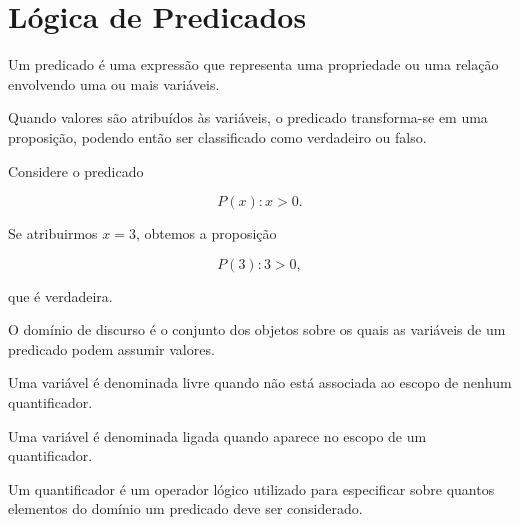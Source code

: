 \documentclass[../../main]{subfiles}
\begin{document}
\section{Lógica de Predicados}
\label{sec:matematica:logica-matematica:logica-de-predicados}

\begin{defn}[Predicado]
	\label{def:matematica:logica-matematica:logica-de-predicados:predicado}

	Um predicado é uma expressão que representa uma propriedade ou uma
	relação envolvendo uma ou mais variáveis.

	Quando valores são atribuídos às variáveis, o predicado transforma-se
	em uma proposição, podendo então ser classificado como verdadeiro ou
	falso.
\end{defn}

\begin{ex}

	Considere o predicado

	\[
		P(x): x > 0.
	\]

	Se atribuirmos \(x=3\), obtemos a proposição

	\[
		P(3): 3 > 0,
	\]

	que é verdadeira.

\end{ex}

\begin{defn}
	\label{def:matematica:logica-matematica:logica-de-predicados:dominio-de-discurso}

	O domínio de discurso é o conjunto dos objetos sobre os quais as
	variáveis de um predicado podem assumir valores.
\end{defn}

\begin{defn}
	\label{def:matematica:logica-matematica:logica-de-predicados:variavel-livre}

	Uma variável é denominada livre quando não está associada ao escopo de
	nenhum quantificador.
\end{defn}

\begin{defn}
	\label{def:matematica:logica-matematica:logica-de-predicados:variavel-ligada}

	Uma variável é denominada ligada quando aparece no escopo de um
	quantificador.
\end{defn}

\begin{defn}[Quantificador]
	\label{def:matematica:logica-matematica:logica-de-predicados:quantificador}

	Um quantificador é um operador lógico utilizado para especificar sobre
	quantos elementos do domínio um predicado deve ser considerado.
\end{defn}
\end{document}
